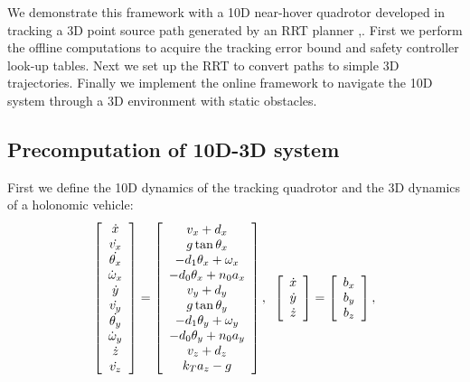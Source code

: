 We demonstrate this framework with a 10D near-hover quadrotor developed in \cite{Bouffard12} tracking a 3D point source path generated by an RRT planner \cite{Kuffner2000},\cite{Kavraki1996}. First we perform the offline computations to acquire the tracking error bound and safety controller look-up tables. Next we set up the RRT to convert paths to simple 3D trajectories. Finally we implement the online framework to navigate the 10D system through a 3D environment with static obstacles.

\subsection{Precomputation of 10D-3D system}
First we define the 10D dynamics of the tracking quadrotor and the 3D dynamics of a holonomic vehicle:
\begin{equation}
\small
\label{eq:Quad10D_dyn}
\begin{aligned}
\begin{array}{c}
\left[
\begin{array}{c}
\dot{x}\\
\dot{v_x}\\
\dot{\theta_x}\\
\dot\omega_x\\
\dot{y}\\
\dot{v_y}\\
\dot{\theta_y}\\
\dot\omega_y\\
\dot{z}\\
\dot{v_z}
\end{array}
\right]
=
\left[
\begin{array}{c}
v_x + d_x\\
g \tan \theta_x\\
-d_1 \theta_x + \omega_x\\
-d_0 \theta_x + n_0 a_x\\
v_y + d_y\\
g \tan \theta_y\\
-d_1 \theta_y + \omega_y\\
-d_0 \theta_y + n_0 a_y\\
v_z + d_z\\
k_T a_z - g
\end{array}
\right],\;\;
\left[
\begin{array}{c}
\dot{x}\\
\dot{y}\\
\dot{z}\\
\end{array}
\right] 
=
\left[
\begin{array}{c}
b_x\\
b_y\\
b_z \\
\end{array}
\right],
\end{array}\\
\end{aligned}
\end{equation}

